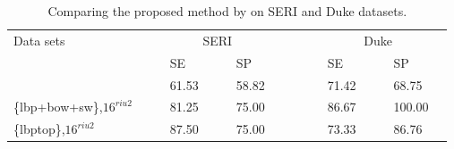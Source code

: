 \begin{tiny}
  \vspace{-.5cm}
\begin{table}
\caption{Comparing the proposed method by \cite{Venhuizen2015} on SERI and Duke datasets.}%
\centering
\begin{tabular}{lcclcclcccclcclc}
\toprule
Data sets 	& & &\multicolumn{4}{c}{SERI}& & & & &\multicolumn{4}{c}{Duke} & \\
  \cmidrule(l){2-8}  \cmidrule(l){10-16}
	         & & & SE & & & SP & & & & & SE & & & SP & \\
\midrule
 \cite{Venhuizen2015} 		& & & 61.53 & & & 58.82 & & & & & 71.42 & & & 68.75 & \\
\{\ac{lbp}+\ac{bow}+\ac{sw}\},$16^{riu2}$ 	& & & 81.25 & & & 75.00 & & & & & 86.67 & & & 100.00 &  \\
\{\ac{lbptop}\},$16^{riu2}$				& & & 87.50 & & & 75.00 & & & & & 73.33 & & & 86.76 &  \\


\bottomrule
\end{tabular}
\label{tab:ComparisonRefandOurs}
\end{table}

\end{tiny}
\vspace{-1cm}


